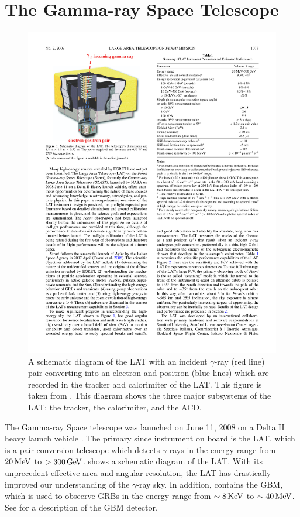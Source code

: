 \section{The \fermi Gamma-ray Space Telescope}

\begin{figure}[htbp]
  \centering
    \includegraphics{chapters/introduction/figures/lat_detector_cutout.pdf}
  \caption{A schematic diagram of the \ac{LAT} with an incident $\gamma$-ray
    (red line) pair-converting into an electron and positron (blue lines)
    which are recorded in the tracker and calorimiter of the \ac{LAT}.
    This figure is taken from \citep{atwood_2009a_large-telescope}.  
    This diagram shows the three major subsystems of the \ac{LAT}:
    the tracker, the calorimiter, and the \ac{ACD}.
  }
\end{figure} 


The \fermi Gamma-ray Space telescope was launched on June 11, 2008 on
a Delta II heavy launch vehicle \citep{atwood_2009a_large-telescope}.
The primary since instrument on board \fermi is the \ac{LAT},
which is a pair-conversion telescope which detects $\gamma$-rays
in the energy range from $20\,\text{MeV}$ to $>300\,\text{GeV}$.
 shows a schematic diagram of the \ac{LAT}.
With its unprecedent effective area and angular resolution, the \ac{LAT}
has drastically improved our understanding of the $\gamma$-ray sky.
In addition, \fermi contains the \Ac{GBM}, which is used to obseerve
\acp{GRB} in the energy range from $\sim8\,\text{KeV}$ to $\sim40\,\text{MeV}$.
See \cite{meegan_2009a_fermi-gamma-ray} for a description of the \ac{GBM}
detector.


